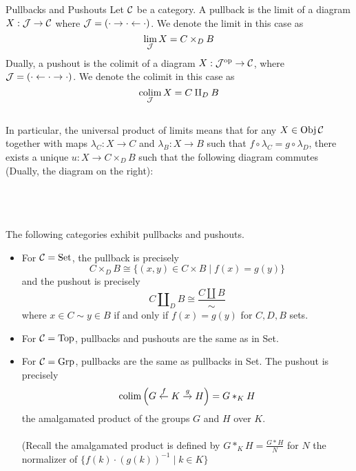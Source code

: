 \documentclass[a4paper]{article}
\begin{document}
\begin{defn}{Pullbacks and Pushouts}{} Let $\mathcal{C}$ be a category. A pullback is the limit of a diagram $X:\mathcal{J}\to\mathcal{C}$ where $\mathcal{J}=\left(\cdot\rightarrow\cdot\leftarrow\cdot\right)$. We denote the limit in this case as $$\lim_{\mathcal{J}} X=C\times_DB$$ Dually, a pushout is the colimit of a diagram $X:\mathcal{J}^{\text{op}}\to\mathcal{C}$, where $\mathcal{J}=\left(\cdot\leftarrow\cdot\rightarrow\cdot\right)$. We denote the colimit in this case as $$\operatorname*{colim}_{\mathcal{J}} X=C\amalg_DB$$~\\

In particular, the universal product of limits means that for any $X\in\operatorname{Obj}\mathcal{C}$ together with maps $\lambda_C:X\to C$ and $\lambda_B:X\to B$ such that $f\circ\lambda_C=g\circ\lambda_D$, there exists a unique $u:X\to C\times_DB$ such that the following diagram commutes (Dually, the diagram on the right): \\~\\
\\~\\
\end{defn}

\begin{prp}{}{} The following categories exhibit pullbacks and pushouts. 
\begin{itemize}
\item For $\mathcal{C}=\text{Set}$, the pullback is precisely $$C\times_DB\cong\{(x,y)\in C\times B\;|\;f(x)=g(y)\}$$ and the pushout is precisely $$C\amalg_DB\cong\frac{C\amalg B}{\sim}$$ where $x\in C\sim y\in B$ if and only if $f(x)=g(y)$ for $C,D,B$ sets. 
\item For $\mathcal{C}=\text{Top}$, pullbacks and pushouts are the same as in Set. 
\item For $\mathcal{C}=\text{Grp}$, pullbacks are the same as pullbacks in Set. The pushout is precisely $$\operatorname*{colim}\left(G\overset{f}{\leftarrow}K\overset{g}{\rightarrow}H\right)=G\ast_KH$$ the amalgamated product of the groups $G$ and $H$ over $K$. \\~\\(Recall the amalgamated product is defined by $G\ast_KH=\frac{G\ast H}{N}$ for $N$ the normalizer of $\{f(k)\cdot(g(k))^{-1}\;|\;k\in K\}$
\end{itemize}
\end{prp}
\end{document}

